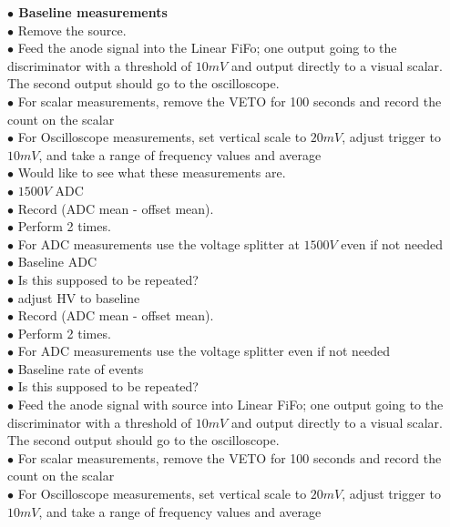 \textbf{\color[rgb]{1,0.5,0}$\bullet$ Baseline measurements}\\
$\bullet$ Remove the source.\\
$\bullet$ Feed the anode signal into the Linear FiFo; one output going to the discriminator with a threshold of $10 mV$ and output directly to a visual scalar. The second output should go to the oscilloscope.\\
$\bullet$ For scalar measurements, remove the VETO for 100 seconds and record the count on the scalar\\
$\bullet$ For Oscilloscope measurements, set vertical scale to $20 mV$, adjust trigger to $10 mV$, and take a range of frequency values and average\\
{\color{blue}$\bullet$ Would like to see what these measurements are.}\\
$\bullet$ $1500 V$ ADC\\
$\bullet$ Record (ADC mean - offset mean).\\
$\bullet$ Perform 2 times.\\
$\bullet$ For ADC measurements use the voltage splitter at $1500 V$ even if not needed\\
$\bullet$ Baseline ADC\\
{\color{blue}$\bullet$ Is this supposed to be repeated?}\\
$\bullet$ adjust HV to baseline\\
$\bullet$ Record (ADC mean - offset mean).\\
$\bullet$ Perform 2 times.\\
$\bullet$ For ADC measurements use the voltage splitter even if not needed\\
$\bullet$ Baseline rate of events\\
{\color{blue}$\bullet$ Is this supposed to be repeated?}\\
$\bullet$ Feed the anode signal with source into Linear FiFo; one output going to the discriminator with a threshold of $10 mV$ and output directly to a visual scalar. The second output should go to the oscilloscope.\\
$\bullet$ For scalar measurements, remove the VETO for 100 seconds and record the count on the scalar\\
$\bullet$ For Oscilloscope measurements, set vertical scale to $20 mV$, adjust trigger to $10 mV$, and take a range of frequency values and average\\

